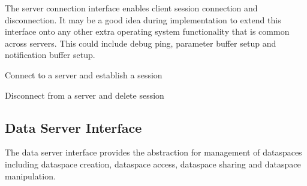 The server connection interface enables client session connection and disconnection. It may be a good idea during implementation to extend this interface onto any other extra operating system functionality that is common across servers. This could include debug ping, parameter buffer setup and notification buffer setup.

\begin{description}

    \item {}
        Connect to a server and establish a session

    \item {}
        Disconnect from a server and delete session

\end{description}

\subsection{Data Server Interface}

The data server interface provides the abstraction for management of dataspaces including dataspace creation, dataspace access, dataspace sharing and dataspace manipulation.

